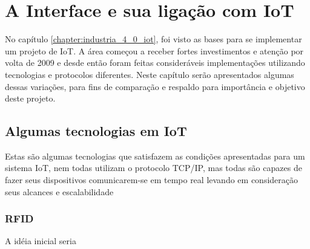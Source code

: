 \chapter{A Interface e sua ligação com IoT}
\label{chapter:interface_iot}

No capítulo \ref{chapter:industria_4_0_iot}, foi visto as bases para se implementar um projeto de IoT. A área começou a receber fortes investimentos e atenção por volta de 2009 e desde então foram feitas consideráveis implementações utilizando tecnologias e protocolos diferentes. Neste capítulo serão apresentados algumas dessas variações, para fins de comparação e respaldo para importância e objetivo deste projeto.


\section{Algumas tecnologias em IoT}
\label{section:tecnologias_iot}

Estas são algumas tecnologias que satisfazem as condições apresentadas para um sistema IoT, nem todas utilizam o protocolo TCP/IP, mas todas são  capazes de fazer seus dispositivos comunicarem-se em tempo real levando em consideração seus alcances e escalabilidade

\subsection{RFID}
\label{subsection:rfid}



A idéia inicial seria